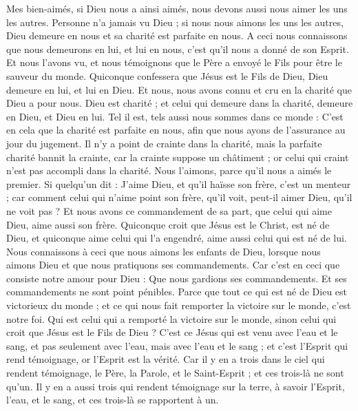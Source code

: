 \begin{multicols}{2}
Mes bien-aimés, si Dieu nous a ainsi aimés, nous devons aussi nous aimer les uns les autres.
Personne n'a jamais vu Dieu ; si nous nous aimons les uns les autres, Dieu demeure en nous et sa charité est parfaite en nous.
A ceci nous connaissons que nous demeurons en lui, et lui en nous, c'est qu'il nous a donné de son Esprit.
Et nous l'avons vu, et nous témoignons que le Père a envoyé le Fils pour être le sauveur du monde.
Quiconque confessera que Jésus est le Fils de Dieu, Dieu demeure en lui, et lui en Dieu.
Et nous, nous avons connu et cru en la charité que Dieu a pour nous. Dieu est charité ; et celui qui demeure dans la charité, demeure en Dieu, et Dieu en lui.
Tel il est, tels aussi nous sommes dans ce monde : C’est en cela que la charité est parfaite en nous, afin que nous ayons de l’assurance au jour du jugement.
Il n'y a point de crainte dans la charité, mais la parfaite charité bannit la crainte, car la crainte suppose un châtiment ; or celui qui craint n'est pas accompli dans la charité.
Nous l'aimons, parce qu'il nous a aimés le premier.
Si quelqu'un dit : J'aime Dieu, et qu’il haïsse son frère, c’est un menteur ; car comment celui qui n'aime point son frère, qu'il voit, peut-il aimer Dieu, qu’il ne voit pas ?
Et nous avons ce commandement de sa part, que celui qui aime Dieu, aime aussi son frère.
\VerseOne{}Quiconque croit que Jésus est le Christ, est né de Dieu, et quiconque aime celui qui l'a engendré, aime aussi celui qui est né de lui.
Nous connaissons à ceci que nous aimons les enfants de Dieu, lorsque nous aimons Dieu et que nous pratiquons ses commandements.
Car c'est en ceci que consiste notre amour pour Dieu : Que nous gardions ses commandements. Et ses commandements ne sont point pénibles.
Parce que tout ce qui est né de Dieu est victorieux du monde ; et ce qui nous fait remporter la victoire sur le monde, c'est notre foi.
Qui est celui qui a remporté la victoire sur le monde, sinon celui qui croit que Jésus est le Fils de Dieu ?
C'est ce Jésus qui est venu avec l’eau et le sang, et pas seulement avec l'eau, mais avec l'eau et le sang ; et c'est l'Esprit qui rend témoignage, or l'Esprit est la vérité.
Car il y en a trois dans le ciel qui rendent témoignage, le Père, la Parole, et le Saint-Esprit ; et ces trois-là ne sont qu'un{}.
Il y en a aussi trois qui rendent témoignage sur la terre, à savoir l'Esprit, l'eau, et le sang, et ces trois-là se rapportent à un.

\end{multicols}
